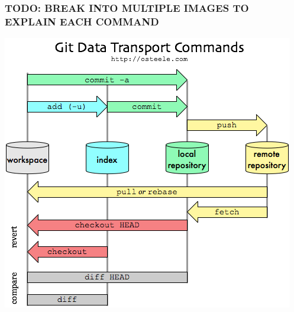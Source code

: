 \documentclass[table,tikz,12pt,svgnames]{beamer}
\begin{document}
\begin{frame}
\frametitle{TODO: BREAK INTO MULTIPLE IMAGES TO EXPLAIN EACH COMMAND}
\vspace{-2em}
\begin{block}{}
		\begin{center}
			{\includegraphics[scale=0.45]{images/MgaV9.png}}
		\end{center}
\end{block}
\end{frame}
\end{document}
